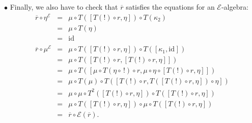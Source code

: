 \documentclass{LMCS}
\newcommand{\after}{\mathrel{\circ}}
\newcommand{\idmap}[1][]{\ensuremath{\mathrm{id}_{#1}}}
\newcommand{\E}{\ensuremath{\mathcal{E}}}
\begin{document}
{\begin{iteMize}{$\bullet$}
Finally, we also have to check that $\overline{r}$ satisfies
the equations for an $\E$-algebra:
$$\begin{array}{rcl}
\overline{r} \after \eta^{\E}
& = &
\mu \after T([T(!) \after r, \eta]) \after T(\kappa_{2}) \\
& = &
\mu \after T(\eta) \\
& = &
\idmap \\
\overline{r} \after \mu^{\E}
& = &
\mu \after T([T(!) \after r, \eta]) \after T([\kappa_{1},\idmap]) \\
& = &
\mu \after T([T(!) \after r, [T(!) \after r, \eta]]) \\
& = &
\mu \after T([\mu \after T(\eta\after\,!) \after r, 
   \mu \after \eta \after [T(!) \after r, \eta]]) \\
& = &
\mu \after T(\mu) \after  
   T([T(!) \after r, T([T(!) \after r, \eta]) \after \eta]) \\
& = &
\mu \after \mu \after T^{2}([T(!) \after r, \eta]) \after 
   T([T(!) \after r, \eta]) \\
& = &
\mu \after T([T(!) \after r, \eta]) \after \mu \after 
   T([T(!) \after r, \eta]) \\
& = &
\overline{r} \after \E(\overline{r}).
\end{array}$$

\end{iteMize}

}
\end{document}
